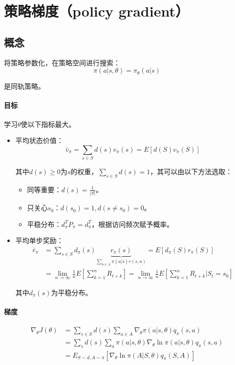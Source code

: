 \documentclass[
12pt, %
a4paper, 
oneside, %
headinclude,footinclude, %
]{scrartcl}
\begin{document}
\section[策略梯度]{策略梯度（policy gradient）}
\subsection[概念]{概念}
将策略参数化，在策略空间进行搜索：
$$ \pi(a|s, \theta) = \pi_{\theta}(a|s) $$

是同轨策略。
\paragraph{目标}
学习$ \theta $使以下指标最大。

\begin{itemize}
\item 平均状态价值：
$$ \bar{v}_\pi = \sum_{s\in S} d(s) v_\pi(s) = E[d(S)v_\pi(S)] $$

其中$ d(s) \geq 0 $为$ s $的权重，$ \sum_{s \in S} d(s) = 1 $，其可以由以下方法选取：
\begin{itemize}
\item 同等重要：$ d(s) = \frac{1}{|S|} $。
\item 只关心$ s_0 $：$ d(s_0) = 1, d(s \neq s_0) = 0 $。
\item 平稳分布：$ d_{\pi}^T P_{\pi} = d_{\pi}^T $，根据访问频次赋予概率。
\end{itemize}
\item 平均单步奖励：
\begin{align*}
\bar{r}_\pi &= \sum_{s\in S} d_{\pi}(s) \underbrace{r_\pi(s)}_{\sum_{a \in A}\pi(a|s)r(s, a)} = E[d_{\pi}(S)r_\pi(S)] \\
&= \lim_{n \to \infty} \frac{1}{n}E[\sum_{k = 1}^{n} R_{t + k}] = \lim_{n \to \infty} \frac{1}{n}E[\sum_{k = 1}^{n} R_{t + k}|S_t = s_0]
\end{align*}

其中$ d_{\pi}(s) $为平稳分布。
\end{itemize}
\paragraph{梯度}
\begin{align*}
\nabla_\theta J(\theta) &= \sum_{s \in S} d(s) \sum_{a \in A} \nabla_\theta \pi(a|s, \theta) q_\pi(s, a) \\
&= \sum_s d(s) \sum_a \pi(a|s, \theta) \nabla_\theta \ln \pi(a|s, \theta) q_\pi(s, a) \\
&= E_{S \sim d, A \sim \pi}[\nabla_\theta \ln \pi(A|S, \theta) q_\pi(S, A)]
\end{align*}
\end{document}
